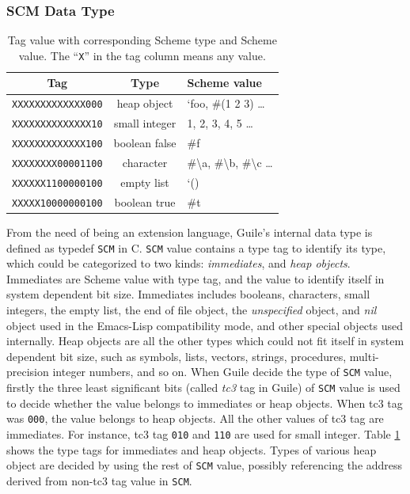 \documentclass[preprint, numbers]{sigplanconf}
\begin{document}

\subsubsection{SCM Data Type}
\begin{table}
  \centering
  \begin{tabular}{ccl}
    \toprule
    Tag&Type&Scheme value\\
    \midrule
    \texttt{XXXXXXXXXXXXX000} & heap object & `foo, \#(1 2 3) \ldots \\
    \texttt{XXXXXXXXXXXXXX10} & small integer & 1, 2, 3, 4, 5 \ldots \\
    \texttt{XXXXXXXXXXXXX100} & boolean false & \#f \\
    \texttt{XXXXXXXX00001100} & character & \#\textbackslash a, \#\textbackslash b,
    \#\textbackslash c \ldots \\ %
    \texttt{XXXXXX1100000100} & empty list & `() \\ %
    \texttt{XXXXX10000000100} & boolean true & \#t \\
    \bottomrule
  \end{tabular}
  \caption{Tag value with corresponding Scheme type and Scheme value. The
    ``\texttt{X}'' in the tag column means any value.}
\label{tab:tags}
\end{table}

From the need of being an extension language, Guile's internal data type is
defined as typedef \texttt{SCM} in C\cite{guileref}. \texttt{SCM} value
contains a type tag to identify its type, which could be categorized to two
kinds: \textit{immediates}, and \textit{heap objects}. Immediates are Scheme
value with type tag, and the value to identify itself in system dependent bit
size. Immediates includes booleans, characters, small integers, the empty
list, the end of file object, the \textit{unspecified} object, and
\textit{nil} object used in the Emacs-Lisp compatibility mode, and other
special objects used internally. Heap objects are all the other types which
could not fit itself in system dependent bit size, such as symbols, lists,
vectors, strings, procedures, multi-precision integer numbers, and so on.
When Guile decide the type of \texttt{SCM} value, firstly the three least
significant bits (called \textit{tc3} tag in Guile) of \texttt{SCM} value is
used to decide whether the value belongs to immediates or heap objects. When
tc3 tag was \texttt{000}, the value belongs to heap objects. All the other
values of tc3 tag are immediates. For instance, tc3 tag \texttt{010} and
\texttt{110} are used for small integer. Table
\hyperref[tab:tags]{\ref{tab:tags}} shows the type tags for immediates and
heap objects. Types of various heap object are decided by using the rest of
\texttt{SCM} value, possibly referencing the address derived from non-tc3
tag value in \texttt{SCM}.
\end{document}
